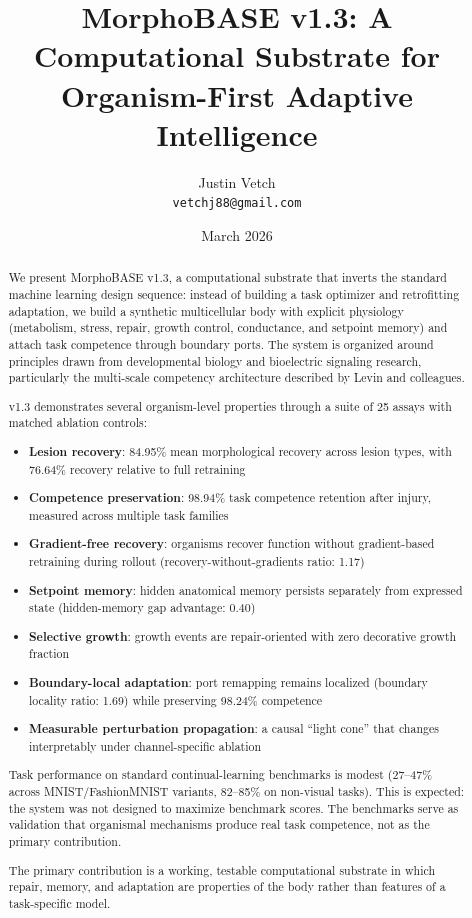 \documentclass[11pt,a4paper]{article}
\title{\textbf{MorphoBASE v1.3: A Computational Substrate for Organism-First Adaptive Intelligence}}
\author{Justin Vetch \\ \texttt{vetchj88@gmail.com}}
\date{March 2026}
\begin{document}
\maketitle

\begin{abstract}
We present MorphoBASE v1.3, a computational substrate that inverts the standard machine learning design sequence: instead of building a task optimizer and retrofitting adaptation, we build a synthetic multicellular body with explicit physiology (metabolism, stress, repair, growth control, conductance, and setpoint memory) and attach task competence through boundary ports. The system is organized around principles drawn from developmental biology and bioelectric signaling research, particularly the multi-scale competency architecture described by Levin and colleagues.

v1.3 demonstrates several organism-level properties through a suite of 25 assays with matched ablation controls:
\begin{itemize}[leftmargin=*,itemsep=3pt]
\item \textbf{Lesion recovery}: 84.95\% mean morphological recovery across lesion types, with 76.64\% recovery relative to full retraining
\item \textbf{Competence preservation}: 98.94\% task competence retention after injury, measured across multiple task families
\item \textbf{Gradient-free recovery}: organisms recover function without gradient-based retraining during rollout (recovery-without-gradients ratio: 1.17)
\item \textbf{Setpoint memory}: hidden anatomical memory persists separately from expressed state (hidden-memory gap advantage: 0.40)
\item \textbf{Selective growth}: growth events are repair-oriented with zero decorative growth fraction
\item \textbf{Boundary-local adaptation}: port remapping remains localized (boundary locality ratio: 1.69) while preserving 98.24\% competence
\item \textbf{Measurable perturbation propagation}: a causal ``light cone'' that changes interpretably under channel-specific ablation
\end{itemize}

Task performance on standard continual-learning benchmarks is modest (27--47\% across MNIST/FashionMNIST variants, 82--85\% on non-visual tasks). This is expected: the system was not designed to maximize benchmark scores. The benchmarks serve as validation that organismal mechanisms produce real task competence, not as the primary contribution.

The primary contribution is a working, testable computational substrate in which repair, memory, and adaptation are properties of the body rather than features of a task-specific model.
\end{abstract}
\end{document}
